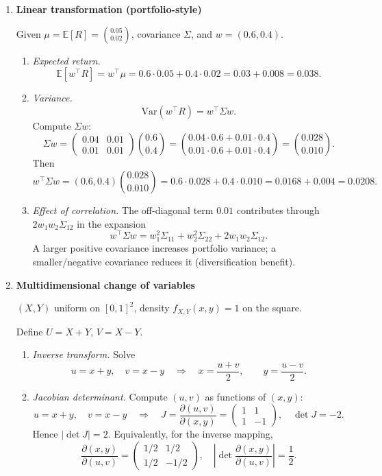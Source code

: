 \documentclass[11pt]{article}
\begin{document}
\begin{enumerate}
\bigskip

\item \textbf{Linear transformation (portfolio-style)}

Given $\mu=\mathbb{E}[R]=\binom{0.05}{0.02}$, covariance $\Sigma$, and $w=(0.6,0.4)$.

\begin{enumerate}
\item \emph{Expected return.}
\[
\mathbb{E}[w^\top R]=w^\top \mu = 0.6\cdot 0.05 + 0.4\cdot 0.02 = 0.03+0.008=0.038.
\]

\item \emph{Variance.}
\[
\mathrm{Var}(w^\top R)=w^\top \Sigma w.
\]
Compute $\Sigma w$:
\[
\Sigma w =
\begin{pmatrix}
0.04 & 0.01\\
0.01 & 0.01
\end{pmatrix}
\binom{0.6}{0.4}
=
\binom{0.04\cdot0.6+0.01\cdot0.4}{0.01\cdot0.6+0.01\cdot0.4}
=
\binom{0.028}{0.010}.
\]
Then
\[
w^\top \Sigma w = (0.6,0.4)\binom{0.028}{0.010}
=0.6\cdot 0.028 + 0.4\cdot 0.010
=0.0168+0.004
=0.0208.
\]

\item \emph{Effect of correlation.}
The off-diagonal term $0.01$ contributes through $2w_1w_2\Sigma_{12}$ in the expansion
\[
w^\top\Sigma w = w_1^2\Sigma_{11}+w_2^2\Sigma_{22}+2w_1w_2\Sigma_{12}.
\]
A larger positive covariance increases portfolio variance; a smaller/negative covariance reduces it (diversification benefit).
\end{enumerate}

\bigskip

\item \textbf{Multidimensional change of variables}

$(X,Y)$ uniform on $[0,1]^2$, density $f_{X,Y}(x,y)=1$ on the square.

Define $U=X+Y$, $V=X-Y$.

\begin{enumerate}
\item \emph{Inverse transform.}
Solve
\[
u=x+y,\quad v=x-y \quad\Rightarrow\quad
x=\frac{u+v}{2},\qquad y=\frac{u-v}{2}.
\]

\item \emph{Jacobian determinant.}
Compute $(u,v)$ as functions of $(x,y)$:
\[
u=x+y,\quad v=x-y
\quad\Rightarrow\quad
J=\frac{\partial(u,v)}{\partial(x,y)}
=
\begin{pmatrix}
1 & 1\\
1 & -1
\end{pmatrix},
\quad
\det J = -2.
\]
Hence $|\det J|=2$. Equivalently, for the inverse mapping,
\[
\frac{\partial(x,y)}{\partial(u,v)}=
\begin{pmatrix}
1/2 & 1/2\\
1/2 & -1/2
\end{pmatrix},
\quad
\left|\det \frac{\partial(x,y)}{\partial(u,v)}\right|=\frac12.
\]


\end{enumerate}
\end{enumerate}
\end{document}
